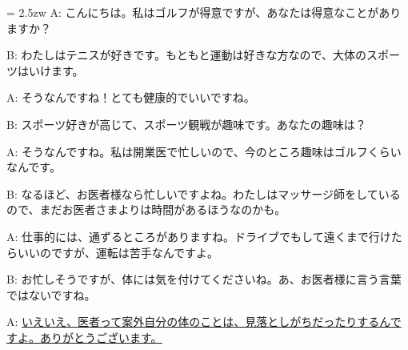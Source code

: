 \documentclass[11pt]{amsart}
\title{}
\author{}
\newenvironment{hangall}[1]{\hangindent = 2.5zw\everypar{\hangindent = 2.5zw}}{}
\begin{document}
\maketitle
\begin{hangall}{}%
A: こんにちは。私はゴルフが得意ですが、あなたは得意なことがありますか？

B: わたしはテニスが好きです。もともと運動は好きな方なので、大体のスポーツはいけます。

A: そうなんですね！とても健康的でいいですね。

B: スポーツ好きが高じて、スポーツ観戦が趣味です。あなたの趣味は？

A: そうなんですね。私は開業医で忙しいので、今のところ趣味はゴルフくらいなんです。

B: なるほど、お医者様なら忙しいですよね。わたしはマッサージ師をしているので、まだお医者さまよりは時間があるほうなのかも。

A: 仕事的には、通ずるところがありますね。ドライブでもして遠くまで行けたらいいのですが、運転は苦手なんですよ。

B: お忙しそうですが、体には気を付けてくださいね。あ、お医者様に言う言葉ではないですね。

A: \ul{いえいえ、医者って案外自分の体のことは、見落としがちだったりするんですよ。ありがとうございます。}\end{hangall}
\end{document}
